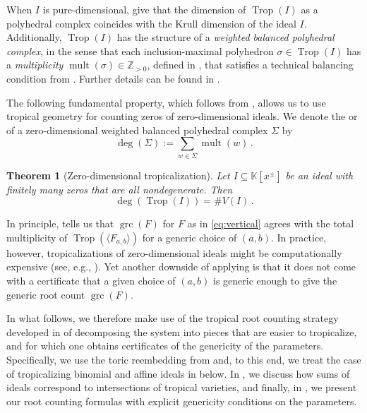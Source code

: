 \documentclass[11pt,reqno,a4paper]{amsart}
\numberwithin{equation}{section}
\theoremstyle{theoremstyle}
\newtheorem{theorem}{Theorem}[section]
\theoremstyle{examplestyle}
\newcommand{\ZZ}{\mathbb{Z}}
\DeclareMathOperator{\grc}{grc}
\DeclareMathOperator{\mult}{mult}
\DeclareMathOperator{\Trop}{Trop}
\newcommand{\term}{\bfemph}
\begin{document}
When $I$ is pure-dimensional, \cite[Theorem~3.3.5,Theorem~3.4.14]{MaclaganSturmfels15} give that the dimension of $\Trop(I)$ as a polyhedral complex coincides with the Krull dimension of the ideal $I$. Additionally, $\Trop(I)$ has the structure of a \emph{weighted balanced polyhedral complex}, in the sense that each inclusion-maximal polyhedron $\sigma\in \Trop(I)$ has a  \emph{multiplicity} $\mult(\sigma)\in\ZZ_{>0}$, defined in \cite[Definition~3.4.3]{MaclaganSturmfels15}, that satisfies a technical balancing condition  from \cite[Definition~3.3.1]{MaclaganSturmfels15}.
Further details can be found in \cite[Section~3.2--3.4]{MaclaganSturmfels15}.


The following fundamental property, which follows from \cite[Proposition~3.4.8]{MaclaganSturmfels15}, allows us to use tropical geometry for counting zeros of zero-dimensional ideals. We denote the \term{degree} or \term{total multiplicity} of a zero-dimensional weighted balanced polyhedral complex $\Sigma$ by
\begin{equation*}\label{eq:total_multiplicity}
\deg(\Sigma):=\sum_{w\in \Sigma}\mult(w)\, .
\end{equation*}


\begin{theorem}[Zero-dimensional tropicalization]
\label{thm:zero-dimensional_case}
Let $I\subseteq \mathbb{K}[x^\pm]$ be an ideal with finitely many zeros that are all nondegenerate.
Then
\[ \deg(\Trop(I))=\#V(I) \, .\]
\end{theorem}

In principle,  tells us that $\grc(F)$ for $F$ as in \eqref{eq:vertical} agrees with the total multiplicity of  
$\Trop(\langle F_{a,b}\rangle)$ for a generic choice of $(a,b)$. 
In practice, however, tropicalizations of zero-dimensional ideals might be computationally expensive (see, e.g., \cite{GorlachRenZhang2022}). Yet another downside of applying  is that it does not come with a certificate that a given choice of $(a,b)$ is generic enough to give the generic root count $\grc(F)$. 

In what follows, we therefore make use of the tropical root counting strategy developed in \cite{LeykinYu2019,HelminckRen22,HoltRen2023,HelminckHenrikssonRen2024} of decomposing the system into pieces that are easier to tropicalize, and for which one obtains certificates of the genericity of the parameters. Specifically, we use the toric reembedding from  and, to this end, we treat the case of tropicalizing binomial and affine ideals in  below. 
In , we discuss how sums of ideals correspond to intersections of tropical varieties, and finally, in , we present our root counting formulas with explicit genericity conditions on the parameters.
\end{document}
